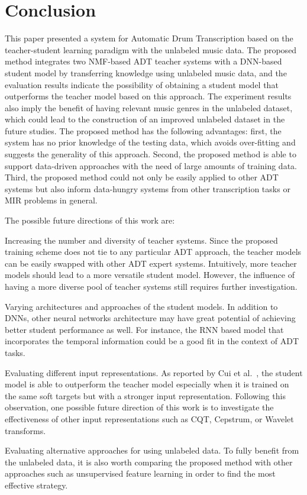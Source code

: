 \documentclass{article}
\begin{document}
\section{Conclusion}\label{sec:conclusion}
This paper presented a system for Automatic Drum Transcription based on the teacher-student learning paradigm with the unlabeled music data. The proposed method integrates two NMF-based ADT teacher systems with a DNN-based student model by transferring knowledge using unlabeled music data, and the evaluation results indicate the possibility of obtaining a student model that outperforms the teacher model based on this approach. The experiment results also imply the benefit of having relevant music genres in the unlabeled dataset, which could lead to the construction of an improved unlabeled dataset in the future studies. The proposed method has the following advantages: first, the system has no prior knowledge of the testing data, which avoids over-fitting and suggests the generality of this approach. Second, the proposed method is able to support data-driven approaches with the need of large amounts of training data. Third, the proposed method could not only be easily applied to other ADT systems but also inform data-hungry systems from other transcription tasks or MIR problems in general.

The possible future directions of this work are:
\begin{inparaenum}[(i)]
    \item   Increasing the number and diversity of teacher systems. Since the proposed training scheme does not tie to any particular ADT approach, the teacher models can be easily swapped with other ADT expert systems. Intuitively, more teacher models should lead to a more versatile student model. However, the influence of having a more diverse pool of teacher systems still requires further investigation. 
    \item   Varying architectures and approaches of the student models. In addition to DNNs, other neural networks architecture may have great potential of achieving better student performance as well. For instance, the RNN based model that incorporates the temporal information could be a good fit in the context of ADT tasks. 
    \item   Evaluating different input representations. As reported by Cui et al.~\cite{Cui2017}, the student model is able to outperform the teacher model especially when it is trained on the same soft targets but with a stronger input representation. Following this observation, one possible future direction of this work is to investigate the effectiveness of other input representations such as CQT, Cepstrum, or Wavelet transforms. 
    \item   Evaluating alternative approaches for using unlabeled data. To fully benefit from the unlabeled data, it is also worth comparing the proposed method with other approaches such as unsupervised feature learning \cite{Raina2007a} in order to find the most effective strategy. 
\end{inparaenum}
\end{document}
